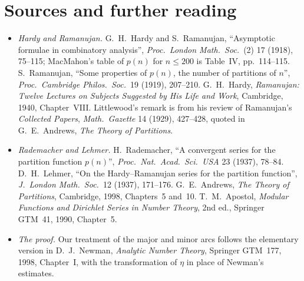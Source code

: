 \section*{Sources and further reading}

\begin{itemize}
\item \emph{Hardy and Ramanujan.} G.~H.~Hardy and S.~Ramanujan, ``Asymptotic formulae in combinatory analysis'', \emph{Proc.\ London Math.\ Soc.}\ (2) 17 (1918), 75--115; MacMahon's table of $p(n)$ for $n\le200$ is Table~IV, pp.~114--115. S.~Ramanujan, ``Some properties of $p(n)$, the number of partitions of $n$'', \emph{Proc.\ Cambridge Philos.\ Soc.}\ 19 (1919), 207--210. G.~H.~Hardy, \emph{Ramanujan: Twelve Lectures on Subjects Suggested by His Life and Work}, Cambridge, 1940, Chapter~VIII. Littlewood's remark is from his review of Ramanujan's \emph{Collected Papers}, \emph{Math.\ Gazette} 14 (1929), 427--428, quoted in G.~E.~Andrews, \emph{The Theory of Partitions}.
\item \emph{Rademacher and Lehmer.} H.~Rademacher, ``A convergent series for the partition function $p(n)$'', \emph{Proc.\ Nat.\ Acad.\ Sci.\ USA} 23 (1937), 78--84. D.~H.~Lehmer, ``On the Hardy--Ramanujan series for the partition function'', \emph{J.\ London Math.\ Soc.}\ 12 (1937), 171--176. G.~E.~Andrews, \emph{The Theory of Partitions}, Cambridge, 1998, Chapters~5 and~10. T.~M.~Apostol, \emph{Modular Functions and Dirichlet Series in Number Theory}, 2nd ed., Springer GTM~41, 1990, Chapter~5.
\item \emph{The proof.} Our treatment of the major and minor arcs follows the elementary version in D.~J.~Newman, \emph{Analytic Number Theory}, Springer GTM~177, 1998, Chapter~I, with the transformation of $\eta$ in place of Newman's estimates.
\end{itemize}

